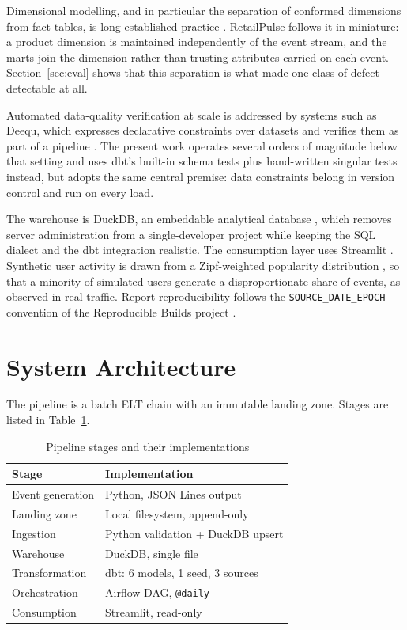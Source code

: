 \documentclass[conference]{IEEEtran}
\begin{document}
Dimensional modelling, and in particular the separation of conformed dimensions
from fact tables, is long-established practice \cite{kimball}. RetailPulse
follows it in miniature: a product dimension is maintained independently of the
event stream, and the marts join the dimension rather than trusting attributes
carried on each event. Section~\ref{sec:eval} shows that this separation is
what made one class of defect detectable at all.

Automated data-quality verification at scale is addressed by systems such as
Deequ, which expresses declarative constraints over datasets and verifies them
as part of a pipeline \cite{deequ}. The present work operates several orders of
magnitude below that setting and uses dbt's built-in schema tests plus
hand-written singular tests instead, but adopts the same central premise: data
constraints belong in version control and run on every load.

The warehouse is DuckDB, an embeddable analytical database \cite{duckdb}, which
removes server administration from a single-developer project while keeping the
SQL dialect and the dbt integration realistic. The consumption layer uses
Streamlit \cite{streamlit}. Synthetic user activity is drawn from a
Zipf-weighted popularity distribution \cite{zipf}, so that a minority of
simulated users generate a disproportionate share of events, as observed in
real traffic. Report reproducibility follows the \texttt{SOURCE\_DATE\_EPOCH}
convention of the Reproducible Builds project \cite{sde}.

\section{System Architecture}
\label{sec:arch}

The pipeline is a batch ELT chain with an immutable landing zone. Stages are
listed in Table~\ref{tab:components}.

\begin{table}[t]
\caption{Pipeline stages and their implementations}
\label{tab:components}
\centering
\begin{tabular}{|l|l|}
\hline
\textbf{Stage} & \textbf{Implementation} \\
\hline
Event generation & Python, JSON Lines output \\
Landing zone & Local filesystem, append-only \\
Ingestion & Python validation + DuckDB upsert \\
Warehouse & DuckDB, single file \\
Transformation & dbt: 6 models, 1 seed, 3 sources \\
Orchestration & Airflow DAG, \texttt{@daily} \\
Consumption & Streamlit, read-only \\
\hline
\end{tabular}
\end{table}
\end{document}
